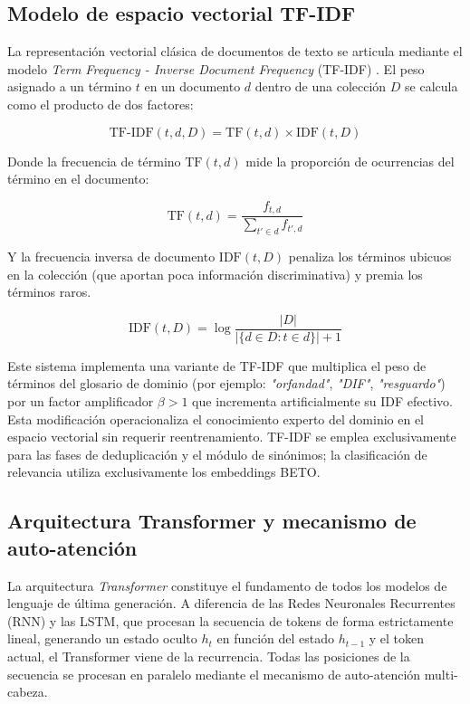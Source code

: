 \subsection{Modelo de espacio vectorial TF-IDF}
\label{subsec:mt_tfidf}


La representación vectorial clásica de documentos de texto se articula mediante
el modelo \textit{Term Frequency - Inverse Document Frequency} (TF-IDF)
\cite{salton1988term}. El peso asignado a un término $t$ en un documento $d$ dentro
de una colección $D$ se calcula como el producto de dos factores:

\begin{equation}
    \text{TF-IDF}(t, d, D) = \text{TF}(t, d) \times \text{IDF}(t, D)
\end{equation}

Donde la frecuencia de término $\text{TF}(t, d)$ mide la proporción de ocurrencias
del término en el documento:

\begin{equation}
    \text{TF}(t, d) = \frac{f_{t,d}}{\sum_{t' \in d} f_{t',d}}
\end{equation}

Y la frecuencia inversa de documento $\text{IDF}(t, D)$ penaliza los términos
ubicuos en la colección (que aportan poca información discriminativa) y premia
los términos raros.

\begin{equation}
    \text{IDF}(t, D) = \log\frac{|D|}{|\{d \in D : t \in d\}| + 1}
\end{equation}

Este sistema implementa una variante de TF-IDF que multiplica
el peso de términos del glosario de dominio (por ejemplo: \textit{"orfandad"},
\textit{"DIF"}, \textit{"resguardo"}) por un factor amplificador $\beta > 1$ que incrementa
artificialmente su IDF efectivo. Esta modificación operacionaliza el
conocimiento experto del dominio en el espacio vectorial sin requerir reentrenamiento.
TF-IDF se emplea exclusivamente para las fases de deduplicación y el módulo de sinónimos;
la clasificación de relevancia utiliza exclusivamente los embeddings BETO.

\subsection{Arquitectura Transformer y mecanismo de auto-atención}
\label{subsec:mt_transformer}


La arquitectura \textit{Transformer} \cite{vaswani2017attention} constituye el
fundamento de todos los modelos de lenguaje de última generación. A diferencia de
las Redes Neuronales Recurrentes (RNN) y las LSTM, que procesan la secuencia de
tokens de forma estrictamente lineal, generando un estado oculto $h_t$ en función
del estado $h_{t-1}$ y el token actual, el Transformer viene de la recurrencia.
Todas las posiciones de la secuencia se procesan en paralelo mediante el mecanismo
de auto-atención multi-cabeza.

